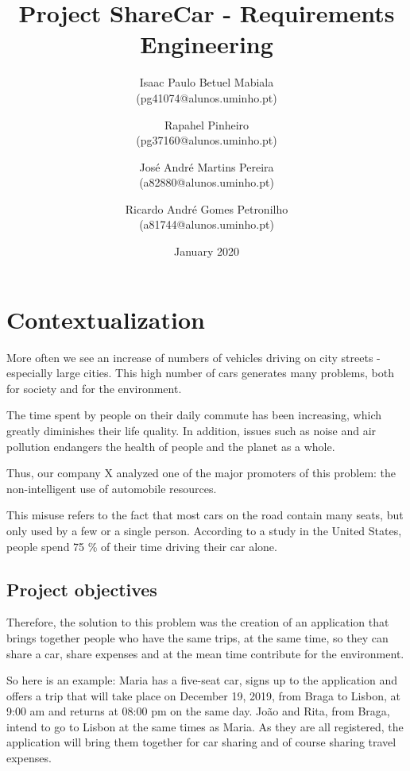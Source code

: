 \documentclass{article}
\title{Project ShareCar - Requirements Engineering}
\author{Isaac Paulo Betuel Mabiala\\ (pg41074@alunos.uminho.pt) \and Rapahel Pinheiro \\ (pg37160@alunos.uminho.pt) \and José André Martins Pereira\\ (a82880@alunos.uminho.pt) \and Ricardo André Gomes Petronilho\\ (a81744@alunos.uminho.pt)}
\date{January 2020}
\begin{document}
\maketitle

\section{Contextualization}

\hspace{5mm} More often we see an increase of numbers of vehicles driving on city streets - especially large cities. This high number of cars generates many problems, both for society and for the environment.

\hspace{5mm} The time spent by people on their daily commute has been increasing, which greatly diminishes their life quality. In addition, issues such as noise and air pollution endangers the health of people and the planet as a whole.

\hspace{5mm} Thus, our company X analyzed one of the major promoters of this problem: the non-intelligent use of automobile resources.

\hspace{5mm} This misuse refers to the fact that most cars on the road contain many seats, but only used by a few or a single person. According to a study in the United States, people spend 75 \% of their time driving their car alone.

\subsection{Project objectives}
\hspace{5mm} Therefore, the solution to this problem was the creation of an application that brings together people who have the same trips, at the same time, so they can share a car, share expenses and at the mean time contribute for the environment.

\hspace{5mm} So here is an example: Maria has a five-seat car, signs up to the application and offers a trip that will take place on December 19, 2019, from Braga to Lisbon, at 9:00 am and returns at 08:00 pm on the same day. João and Rita, from Braga, intend to go to Lisbon at the same times as Maria. As they are all registered, the application will bring them together for car sharing and of course sharing travel expenses.
\end{document}
